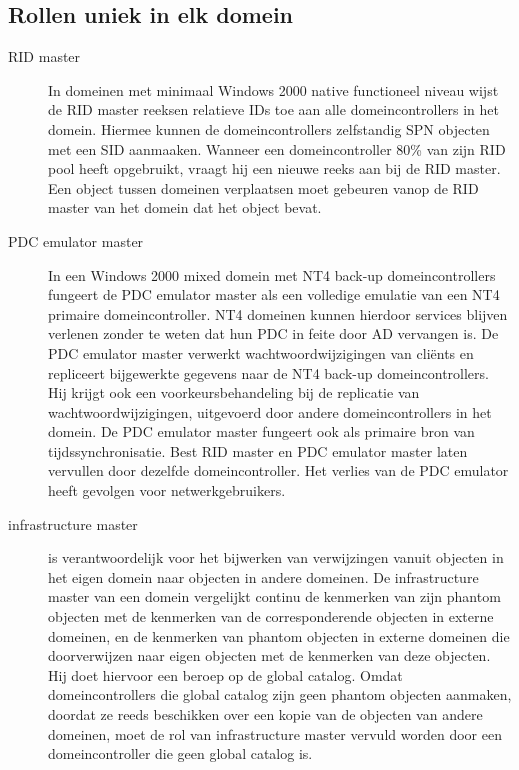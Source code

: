 \subsection{Rollen uniek in elk domein}
\begin{description}
	\item[RID master] In domeinen met minimaal Windows 2000 native
		functioneel niveau wijst de RID master reeksen relatieve IDs
		toe aan alle domeincontrollers in het domein. Hiermee kunnen de
		domeincontrollers zelfstandig SPN objecten met een SID
		aanmaaken. Wanneer een domeincontroller 80\% van zijn RID pool
		heeft opgebruikt, vraagt hij een nieuwe reeks aan bij de RID
		master.
		Een object tussen domeinen verplaatsen moet gebeuren vanop de
		RID master van het domein dat het object bevat.
	\item[PDC emulator master] In een Windows 2000 mixed domein met NT4
		back-up domeincontrollers fungeert de PDC emulator master als
		een volledige emulatie van een NT4 primaire domeincontroller.
		NT4 domeinen kunnen hierdoor services blijven verlenen zonder te
		weten dat hun PDC in feite door AD vervangen is. De PDC emulator
		master verwerkt wachtwoordwijzigingen van cliënts en repliceert
		bijgewerkte gegevens naar de NT4 back-up domeincontrollers. Hij
		krijgt ook een voorkeursbehandeling bij de replicatie van
		wachtwoordwijzigingen, uitgevoerd door andere domeincontrollers
		in het domein.
		De PDC emulator master fungeert ook als primaire bron van
		tijdssynchronisatie. Best RID master en PDC emulator master
		laten vervullen door dezelfde domeincontroller. Het verlies van
		de PDC emulator heeft gevolgen voor netwerkgebruikers.
	\item[infrastructure master] is verantwoordelijk voor het bijwerken van
		verwijzingen vanuit objecten in het eigen domein naar objecten
		in andere domeinen. De infrastructure master van een domein
		vergelijkt continu de kenmerken van zijn phantom objecten met de
		kenmerken van de corresponderende objecten in externe domeinen,
		en de kenmerken van phantom objecten in externe domeinen die
		doorverwijzen naar eigen objecten met de kenmerken van deze
		objecten. Hij doet hiervoor een beroep op de global catalog.
		Omdat domeincontrollers die global catalog zijn geen phantom
		objecten aanmaken, doordat ze reeds beschikken over een kopie
		van de objecten van andere domeinen, moet de rol van
		infrastructure master vervuld worden door een domeincontroller
		die geen global catalog is.
\end{description}

